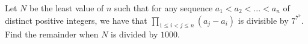 Let $N$ be the least value of $n$ such that for any sequence $a_1 < a_2 < ... < a_n$ of distinct positive integers, we have that $\prod_{1 \leq i < j \leq n} (a_j - a_i)$ is divisible by $7^{7^7}$. Find the remainder when $N$ is divided by $1000$.
